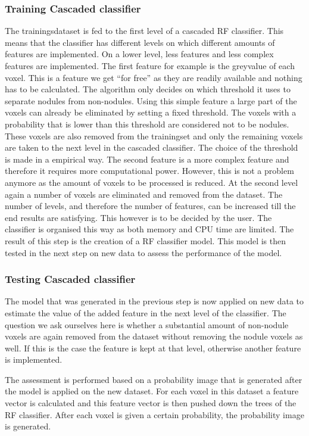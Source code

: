 \subsubsection{Training Cascaded classifier}
The trainingsdataset is fed to the first level of a cascaded RF classifier. This
means that the classifier has different levels on which different amounts of
features are implemented. On a lower level, less features and less complex
features are implemented. The first feature for example is the greyvalue of each
voxel. This is a feature we get ``for free'' as they are readily available and
nothing has to be calculated. The algorithm only decides on which threshold it
uses to separate nodules from non-nodules. Using this simple feature a large
part of the voxels can already be eliminated by setting a fixed threshold.
The voxels with a probability that is lower than this threshold are considered
not to be nodules. These voxels are also removed from the trainingset and only
the remaining voxels are taken to the next level in the cascaded classifier. The
choice of the threshold is made in a empirical way. The second feature is a more
complex feature and therefore it requires more computational power. However,
this is not a problem anymore as the amount of voxels to be processed is
reduced. At the second level again a number of voxels are eliminated and removed
from the dataset. The number of levels, and therefore the number of features,
can be increased till the end results are satisfying. This however is to be
decided by the user. The classifier is organised this way as both memory and CPU
time are limited. The result of this step is the creation of a RF classifier
model. This model is then tested in the next step on new data to assess the
performance of the model.


\subsubsection{Testing Cascaded classifier}
The model that was generated in the previous step is now applied on new data to
estimate the value of the added feature in the next level of the classifier.
The question we ask ourselves here is whether a substantial amount of
non-nodule voxels are again removed from the dataset without removing the nodule
voxels as well. If this is the case the feature is kept at that level, otherwise
another feature is implemented.

The assessment is performed based on a probability image that is generated after
the model is applied on the new dataset. For each voxel in this dataset a
feature vector is calculated and this feature vector is then pushed down the
trees of the RF classifier. After each voxel is given a certain probability, the
probability image is generated.


